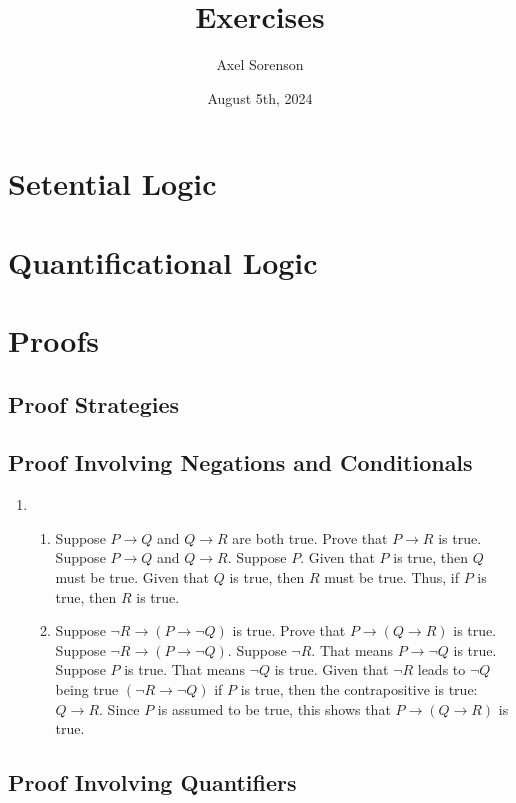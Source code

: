 \documentclass{article}
\title{Exercises}
\author{Axel Sorenson}
\date{August 5th, 2024}
\begin{document}
\maketitle
\section{Setential Logic}
\section{Quantificational Logic}
\section{Proofs}
\subsection{Proof Strategies}
\subsection{Proof Involving Negations and Conditionals}
\begin{enumerate}
\item 
    \begin{enumerate}
    \item Suppose $P \rightarrow Q$ and $Q \rightarrow R$ are both true. Prove that $P \rightarrow R$ is true.\\

        \noindent Suppose $P \rightarrow Q$ and $Q \rightarrow R$. Suppose $P$. Given that $P$ is true, then $Q$ must be true. Given that $Q$ is true, then $R$ must be true. Thus, if $P$ is true, then $R$ is true.

    \item Suppose $\lnot R \rightarrow (P \rightarrow \lnot Q)$ is true. Prove that $P \rightarrow (Q \rightarrow R)$ is true.\\

        \noindent Suppose $\lnot R \rightarrow (P \rightarrow \lnot Q)$. Suppose $\lnot R$. That means $P \rightarrow \lnot Q$ is true. Suppose $P$ is true. That means $\lnot Q$ is true. Given that $\lnot R$ leads to $\lnot Q$ being true $(\lnot R \rightarrow \lnot Q)$ if $P$ is true, then the contrapositive is true: $Q \rightarrow R$. Since $P$ is assumed to be true, this shows that $P \rightarrow (Q \rightarrow R)$ is true.
    \end{enumerate}
\end{enumerate}
\subsection{Proof Involving Quantifiers} 
\end{document}
